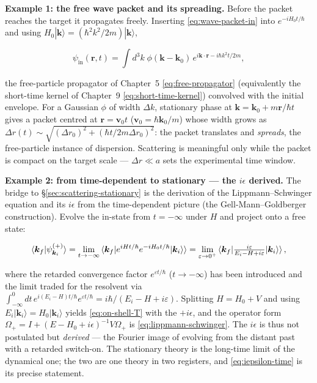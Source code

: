 \medskip\noindent\textbf{Example 1: the free wave packet and its spreading.} Before the packet reaches the target it propagates freely. Inserting \eqref{eq:wave-packet-in} into $e^{-iH_{0}t/\hbar}$ and using $H_{0}|\bm k\rangle=(\hbar^{2}k^{2}/2m)|\bm k\rangle$,
\begin{linenomath}
\begin{equation*}
\psi_{\mathrm{in}}(\bm r,t)=\int d^{3}k\;\phi(\bm k-\bm k_{0})\,e^{i\bm k\cdot\bm r-i\hbar k^{2}t/2m},
\end{equation*}
\end{linenomath}
the free-particle propagator of Chapter~5 \eqref{eq:free-propagator} (equivalently the short-time kernel of Chapter~9 \eqref{eq:short-time-kernel}) convolved with the initial envelope. For a Gaussian $\phi$ of width $\Delta k$, stationary phase at $\bm k=\bm k_{0}+m\bm r/\hbar t$ gives a packet centred at $\bm r=\bm v_{0}t$ ($\bm v_{0}=\hbar\bm k_{0}/m$) whose width grows as $\Delta r(t)\sim\sqrt{(\Delta r_{0})^{2}+(\hbar t/2m\Delta r_{0})^{2}}$: the packet translates and \emph{spreads}, the free-particle instance of dispersion. Scattering is meaningful only while the packet is compact on the target scale --- $\Delta r\ll a$ sets the experimental time window.

\medskip\noindent\textbf{Example 2: from time-dependent to stationary --- the $i\epsilon$ derived.} The bridge to \S\ref{sec:scattering-stationary} is the derivation of the Lippmann--Schwinger equation and its $i\epsilon$ from the time-dependent picture (the Gell-Mann--Goldberger construction). Evolve the in-state from $t=-\infty$ under $H$ and project onto a free state:
\begin{linenomath}
\begin{equation*}
\braket{\bm k_{f}|\psi_{\bm k_{i}}^{(+)}} = \lim_{t\to-\infty}\braket{\bm k_{f}|e^{iHt/\hbar}e^{-iH_{0}t/\hbar}|\bm k_{i}\rangle} = \lim_{\varepsilon\to0^{+}}\braket{\bm k_{f}|\tfrac{i\varepsilon}{E_{i}-H+i\varepsilon}|\bm k_{i}\rangle},
\end{equation*}
\end{linenomath}
where the retarded convergence factor $e^{\varepsilon t/\hbar}$ ($t\to-\infty$) has been introduced and the limit traded for the resolvent via $\int_{-\infty}^{0}dt\,e^{i(E_{i}-H)t/\hbar}e^{\varepsilon t/\hbar}=i\hbar/(E_{i}-H+i\varepsilon)$. Splitting $H=H_{0}+V$ and using $E_{i}|\bm k_{i}\rangle=H_{0}|\bm k_{i}\rangle$ yields \eqref{eq:on-shell-T} with the $+i\epsilon$, and the operator form $\Omega_{+}=I+(E-H_{0}+i\epsilon)^{-1}V\Omega_{+}$ is \eqref{eq:lippmann-schwinger}. The $i\epsilon$ is thus not postulated but \emph{derived} --- the Fourier image of evolving from the distant past with a retarded switch-on. The stationary theory is the long-time limit of the dynamical one; the two are one theory in two registers, and \eqref{eq:iepsilon-time} is its precise statement.

